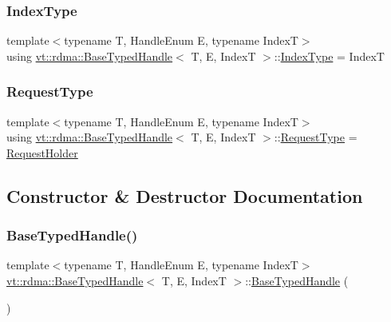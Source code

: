 \subsubsection{\texorpdfstring{Index\+Type}{IndexType}}
{\footnotesize\ttfamily template$<$typename T, Handle\+Enum E, typename IndexT$>$ \\
using \hyperlink{structvt_1_1rdma_1_1_base_typed_handle}{vt\+::rdma\+::\+Base\+Typed\+Handle}$<$ T, E, IndexT $>$\+::\hyperlink{structvt_1_1rdma_1_1_base_typed_handle_aca839871dda1f44f8e59a451174b9a2a}{Index\+Type} =  IndexT}

\mbox{\label{structvt_1_1rdma_1_1_base_typed_handle_a449c2c1948f5793c3fdfb1aba5801ed7}} 
\subsubsection{\texorpdfstring{Request\+Type}{RequestType}}
{\footnotesize\ttfamily template$<$typename T, Handle\+Enum E, typename IndexT$>$ \\
using \hyperlink{structvt_1_1rdma_1_1_base_typed_handle}{vt\+::rdma\+::\+Base\+Typed\+Handle}$<$ T, E, IndexT $>$\+::\hyperlink{structvt_1_1rdma_1_1_base_typed_handle_a449c2c1948f5793c3fdfb1aba5801ed7}{Request\+Type} =  \hyperlink{structvt_1_1rdma_1_1_request_holder}{Request\+Holder}}



\subsection{Constructor \& Destructor Documentation}
\mbox{\label{structvt_1_1rdma_1_1_base_typed_handle_a268fefeb75b88a7642ac14d06b5da963}} 
\subsubsection{\texorpdfstring{Base\+Typed\+Handle()}{BaseTypedHandle()}\hspace{0.1cm}{\footnotesize\ttfamily [1/4]}}
{\footnotesize\ttfamily template$<$typename T, Handle\+Enum E, typename IndexT$>$ \\
\hyperlink{structvt_1_1rdma_1_1_base_typed_handle}{vt\+::rdma\+::\+Base\+Typed\+Handle}$<$ T, E, IndexT $>$\+::\hyperlink{structvt_1_1rdma_1_1_base_typed_handle}{Base\+Typed\+Handle} (\begin{DoxyParamCaption}{ }\end{DoxyParamCaption})\hspace{0.3cm}{\ttfamily [default]}}

